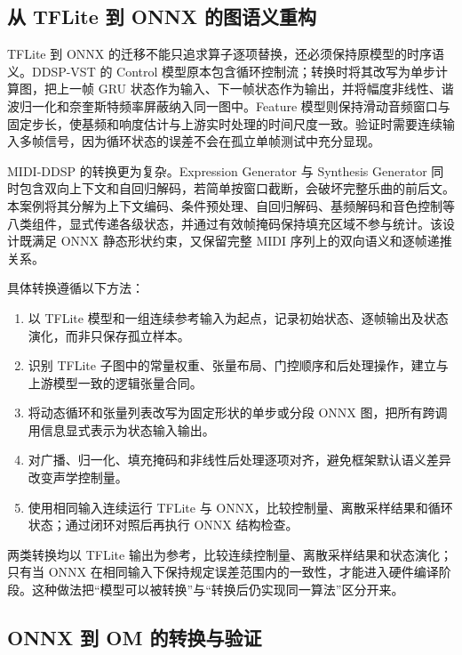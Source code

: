 \subsection{从 TFLite 到 ONNX
的图语义重构}\label{src-experiment-case3-tflite-onnx}

TFLite 到 ONNX
的迁移不能只追求算子逐项替换，还必须保持原模型的时序语义。DDSP-VST 的
Control 模型原本包含循环控制流；转换时将其改写为单步计算图，把上一帧 GRU
状态作为输入、下一帧状态作为输出，并将幅度非线性、谐波归一化和奈奎斯特频率屏蔽纳入同一图中。Feature
模型则保持滑动音频窗口与固定步长，使基频和响度估计与上游实时处理的时间尺度一致。验证时需要连续输入多帧信号，因为循环状态的误差不会在孤立单帧测试中充分显现。

MIDI-DDSP 的转换更为复杂。Expression Generator 与 Synthesis Generator
同时包含双向上下文和自回归解码，若简单按窗口截断，会破坏完整乐曲的前后文。本案例将其分解为上下文编码、条件预处理、自回归解码、基频解码和音色控制等八类组件，显式传递各级状态，并通过有效帧掩码保持填充区域不参与统计。该设计既满足
ONNX 静态形状约束，又保留完整 MIDI 序列上的双向语义和逐帧递推关系。

具体转换遵循以下方法：

\begin{enumerate}
\def\labelenumi{\arabic{enumi}.}
\tightlist
\item
  以 TFLite
  模型和一组连续参考输入为起点，记录初始状态、逐帧输出及状态演化，而非只保存孤立样本。
\item
  识别 TFLite
  子图中的常量权重、张量布局、门控顺序和后处理操作，建立与上游模型一致的逻辑张量合同。
\item
  将动态循环和张量列表改写为固定形状的单步或分段 ONNX
  图，把所有跨调用信息显式表示为状态输入输出。
\item
  对广播、归一化、填充掩码和非线性后处理逐项对齐，避免框架默认语义差异改变声学控制量。
\item
  使用相同输入连续运行 TFLite 与
  ONNX，比较控制量、离散采样结果和循环状态；通过闭环对照后再执行 ONNX
  结构检查。
\end{enumerate}

两类转换均以 TFLite
输出为参考，比较连续控制量、离散采样结果和状态演化；只有当 ONNX
在相同输入下保持规定误差范围内的一致性，才能进入硬件编译阶段。这种做法把``模型可以被转换''与``转换后仍实现同一算法''区分开来。

\subsection{ONNX 到 OM
的转换与验证}\label{src-experiment-case3-atc-pipeline}

